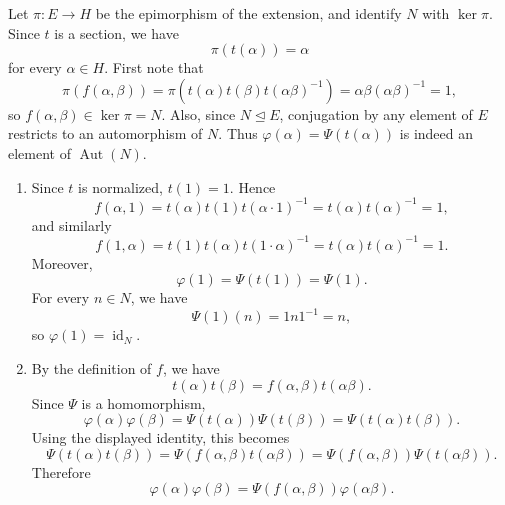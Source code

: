 \documentclass[../Odyssey_Project.tex]{subfiles}
\begin{document}
\begin{solution}
    Let $\pi \colon E \to H$ be the epimorphism of the extension, and identify $N$ with $\ker \pi$. Since $t$ is a section, we have
    \[
        \pi(t(\alpha)) = \alpha
    \]
    for every $\alpha \in H$. First note that
    \[
        \pi(f(\alpha,\beta))
        =
        \pi(t(\alpha)t(\beta)t(\alpha\beta)^{-1})
        =
        \alpha\beta(\alpha\beta)^{-1}
        =
        1,
    \]
    so $f(\alpha,\beta) \in \ker\pi = N$. Also, since $N \trianglelefteq E$, conjugation by any element of $E$ restricts to an automorphism of $N$. Thus $\varphi(\alpha) = \Psi(t(\alpha))$ is indeed an element of $\operatorname{Aut}(N)$.

    \begin{enumerate}
        \item[1] Since $t$ is normalized, $t(1) = 1$. Hence
        \[
            f(\alpha,1)
            =
            t(\alpha)t(1)t(\alpha\cdot 1)^{-1}
            =
            t(\alpha)t(\alpha)^{-1}
            =
            1,
        \]
        and similarly
        \[
            f(1,\alpha)
            =
            t(1)t(\alpha)t(1\cdot \alpha)^{-1}
            =
            t(\alpha)t(\alpha)^{-1}
            =
            1.
        \]
        Moreover,
        \[
            \varphi(1)
            =
            \Psi(t(1))
            =
            \Psi(1).
        \]
        For every $n \in N$, we have
        \[
            \Psi(1)(n) = 1n1^{-1} = n,
        \]
        so $\varphi(1) = \operatorname{id}_N$.

        \item[2] By the definition of $f$, we have
        \[
            t(\alpha)t(\beta) = f(\alpha,\beta)t(\alpha\beta).
        \]
        Since $\Psi$ is a homomorphism,
        \[
            \varphi(\alpha)\varphi(\beta)
            =
            \Psi(t(\alpha))\Psi(t(\beta))
            =
            \Psi(t(\alpha)t(\beta)).
        \]
        Using the displayed identity, this becomes
        \[
            \Psi(t(\alpha)t(\beta))
            =
            \Psi(f(\alpha,\beta)t(\alpha\beta))
            =
            \Psi(f(\alpha,\beta))\Psi(t(\alpha\beta)).
        \]
        Therefore
        \[
            \varphi(\alpha)\varphi(\beta)
            =
            \Psi(f(\alpha,\beta))\varphi(\alpha\beta).
        \]


\end{enumerate}
\end{solution}
\end{document}
